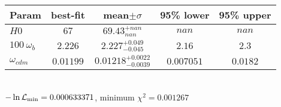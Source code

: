 \begin{tabular}{|l|c|c|c|c|} 
 \hline 
Param & best-fit & mean$\pm\sigma$ & 95\% lower & 95\% upper \\ \hline 
$H0$ &$67$ & $69.43_{nan}^{+nan}$ & $nan$ & $nan$ \\ 
$100~\omega_{b }$ &$2.226$ & $2.227_{-0.045}^{+0.049}$ & $2.16$ & $2.3$ \\ 
$\omega_{cdm }$ &$0.01199$ & $0.01218_{-0.0039}^{+0.0022}$ & $0.007051$ & $0.0182$ \\ 
\hline 
 \end{tabular} \\ 
$-\ln{\cal L}_\mathrm{min} =0.000633371$, minimum $\chi^2=0.001267$ \\ 
